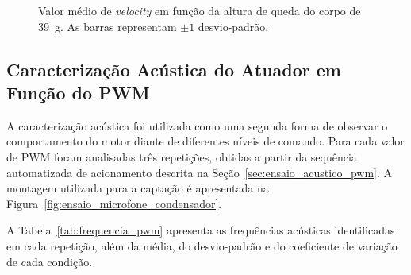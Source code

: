 \begin{figure}[!htbp]
\centering
{}
\caption{Valor médio de \textit{velocity} em função da altura de queda do corpo de 39~g. As barras representam $\pm 1$ desvio-padrão.}
\label{fig:altura_velocity_ensaio}
\end{figure}




\subsection{Caracterização Acústica do Atuador em Função do PWM}
\label{sec:resultado_acustico_pwm}

A caracterização acústica foi utilizada como uma segunda forma de observar o comportamento do motor diante de diferentes níveis de comando. Para cada valor de PWM foram analisadas três repetições, obtidas a partir da sequência automatizada de acionamento descrita na Seção~\ref{sec:ensaio_acustico_pwm}. A montagem utilizada para a captação é apresentada na Figura~\ref{fig:ensaio_microfone_condensador}.

A Tabela~\ref{tab:frequencia_pwm} apresenta as frequências acústicas identificadas em cada repetição, além da média, do desvio-padrão e do coeficiente de variação de cada condição.

